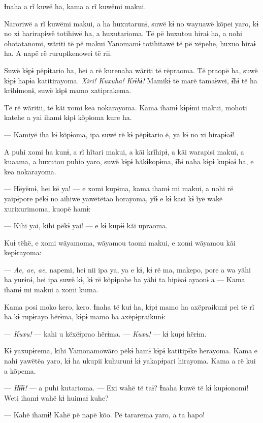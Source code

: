 Ɨnaha a rĩ kuwë ha, kama a rĩ kuwëmi makui. 

Naroriwë a rĩ kuwëmi makui, a ha huxutarunɨ, suwë kɨ no wayuawë kõpei
yaro, kɨ no xi harirapɨwë totihiwë ha, a huxutarioma. Të pë huxutou
hiraɨ ha, a nohi ohotatanomi, wãriti të pë makui Yanomamɨ totihitawë të
pë xëpehe, huxuo hiraɨ ha. A napë rë rurupɨkenowei të rii. 

Suwë kɨpɨ pëpɨtario ha, hei a rë kurenaha wãriti të rëpraoma. Të praopë
ha, suwë kɨpɨ hapɨa katitirayoma. \textit{Xiri! Kuxuha! Krɨhɨ!} Mamikɨ të marë
tamaɨwei, ɨ̃hɨ të ha krɨhɨmonɨ, suwë kɨpɨ mamo xatiprakema. 

Të rë wãritii, të kãi xomi kea nokarayoma. Kama ihamɨ kɨpɨmi makui,
mohoti katehe a yai ihamɨ kɨpɨ kõpɨoma kure ha. 

--- Kamiyë iha kɨ kõpɨoma, ipa suwë rë kɨ pëpɨtario ë, ya kɨ no xi
hirapɨaɨ! 

A puhi xomi ha kunɨ, a rĩ hĩtari makui, a kãi krĩhipɨ, a kãi warapisi
makui, a kuaama, a huxutou puhio yaro, suwë kɨpɨ hãkɨkopɨma, ɨ̃hɨ naha
kɨpɨ kupɨaɨ ha, e kea nokarayoma. 

--- Hëyëmɨ, hei kë ya! --- e xomi kupɨma, kama ihamɨ mi makui, a nohi rë
yaipɨpore pëkɨ no aihiwë yawëtëtao horayoma, yĩɨ e kɨ kasi kɨ ĩyë wakë
xurixurimoma, kuopë hamɨ: 

--- Kihi yai, kihi pëkɨ yai! --- e kɨ kupɨɨ kãi upraoma. 

Kuɨ tëhë, e xomi wãyamoma, wãyamou taomi makui, e xomi wãyamou kãi
kepɨrayoma: 

--- \textit{Ae, ae, ae}, napemi, hei nii ipa ya, ya e kɨ, kɨ rë ma, makepo, pore
a wa yãhi ha yurɨnɨ, hei ipa suwë kɨ, kɨ rë kõpɨpohe ha yãhi ta hipëaɨ
ayaonɨ a --- Kama ihamɨ mi makui a xomi kuma. 

Kama posi moko kero, kero. Ɨnaha të kuɨ ha, kɨpɨ mamo ha axëpraikunɨ pei
të rĩ ha kɨ rupɨrayo hërɨma, kɨpɨ mamo ha axëpɨpraikunɨ:

--- \textit{Kuxu!} --- kahi u këxëɨprao hërɨma. --- \textit{Kuxu!} --- kɨ kupɨ hërɨm. 

Kɨ yaxupɨrema, kihi Yamonamowãro pëkɨ hamɨ kɨpɨ katitipɨke herayoma.
Kama e nahi yawëtëa yaro, kɨ ha ukupii kuhurunɨ kɨ yakapɨpari hirayoma.
Kama a rë kui a kõpema. 

--- \textit{Hɨ̃ɨɨ!} --- a puhi kutarioma. --- Exi wahë të taɨ? Ɨnaha kuwë të kɨ
kupɨonomi! Weti ihamɨ wahë kɨ huimaɨ kuhe?

--- Kahë ihamɨ! Kahë pë napë kõo. Pë tararema yaro, a ta hapo! 

